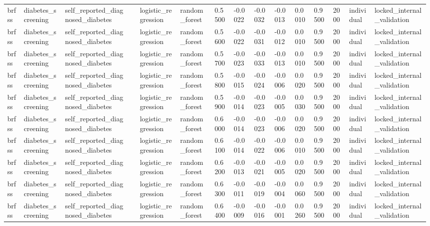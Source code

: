\begin{tabular}{lllllllllllllll}
brfss & diabetes\_screening & self\_reported\_diagnosed\_diabetes &  & logistic\_regression & random\_forest & 0.5500 & -0.0022 & -0.0032 & -0.0013 & 0.0010 & 0.9500 & 2000 & individual & locked\_internal\_validation \\
brfss & diabetes\_screening & self\_reported\_diagnosed\_diabetes &  & logistic\_regression & random\_forest & 0.5600 & -0.0022 & -0.0031 & -0.0012 & 0.0010 & 0.9500 & 2000 & individual & locked\_internal\_validation \\
brfss & diabetes\_screening & self\_reported\_diagnosed\_diabetes &  & logistic\_regression & random\_forest & 0.5700 & -0.0023 & -0.0033 & -0.0013 & 0.0010 & 0.9500 & 2000 & individual & locked\_internal\_validation \\
brfss & diabetes\_screening & self\_reported\_diagnosed\_diabetes &  & logistic\_regression & random\_forest & 0.5800 & -0.0015 & -0.0024 & -0.0006 & 0.0020 & 0.9500 & 2000 & individual & locked\_internal\_validation \\
brfss & diabetes\_screening & self\_reported\_diagnosed\_diabetes &  & logistic\_regression & random\_forest & 0.5900 & -0.0014 & -0.0023 & -0.0005 & 0.0030 & 0.9500 & 2000 & individual & locked\_internal\_validation \\
brfss & diabetes\_screening & self\_reported\_diagnosed\_diabetes &  & logistic\_regression & random\_forest & 0.6000 & -0.0014 & -0.0023 & -0.0006 & 0.0020 & 0.9500 & 2000 & individual & locked\_internal\_validation \\
brfss & diabetes\_screening & self\_reported\_diagnosed\_diabetes &  & logistic\_regression & random\_forest & 0.6100 & -0.0014 & -0.0022 & -0.0006 & 0.0010 & 0.9500 & 2000 & individual & locked\_internal\_validation \\
brfss & diabetes\_screening & self\_reported\_diagnosed\_diabetes &  & logistic\_regression & random\_forest & 0.6200 & -0.0013 & -0.0021 & -0.0005 & 0.0020 & 0.9500 & 2000 & individual & locked\_internal\_validation \\
brfss & diabetes\_screening & self\_reported\_diagnosed\_diabetes &  & logistic\_regression & random\_forest & 0.6300 & -0.0011 & -0.0019 & -0.0004 & 0.0060 & 0.9500 & 2000 & individual & locked\_internal\_validation \\
brfss & diabetes\_screening & self\_reported\_diagnosed\_diabetes &  & logistic\_regression & random\_forest & 0.6400 & -0.0009 & -0.0016 & -0.0001 & 0.0260 & 0.9500 & 2000 & individual & locked\_internal\_validation \\

\end{tabular}
